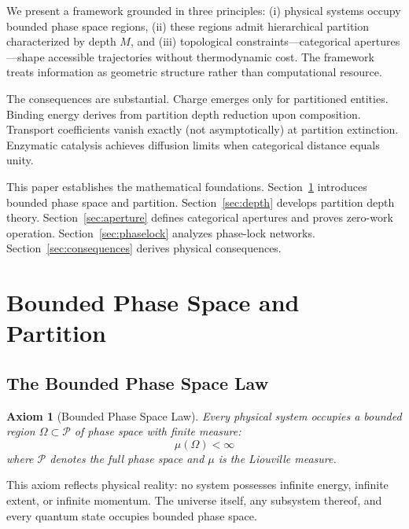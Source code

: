 \documentclass[twocolumn,amsmath,amssymb,aps,prl,superscriptaddress]{revtex4-2}
\newtheorem{axiom}{Axiom}
\newcommand{\Mpart}{M}
\newcommand{\Pspace}{\mathcal{P}}
\begin{document}
We present a framework grounded in three principles: (i) physical systems occupy bounded phase space regions, (ii) these regions admit hierarchical partition characterized by depth $\Mpart$, and (iii) topological constraints---categorical apertures---shape accessible trajectories without thermodynamic cost. The framework treats information as geometric structure rather than computational resource.

The consequences are substantial. Charge emerges only for partitioned entities. Binding energy derives from partition depth reduction upon composition. Transport coefficients vanish exactly (not asymptotically) at partition extinction. Enzymatic catalysis achieves diffusion limits when categorical distance equals unity.

This paper establishes the mathematical foundations. Section~\ref{sec:bounded} introduces bounded phase space and partition. Section~\ref{sec:depth} develops partition depth theory. Section~\ref{sec:aperture} defines categorical apertures and proves zero-work operation. Section~\ref{sec:phaselock} analyzes phase-lock networks. Section~\ref{sec:consequences} derives physical consequences.

\section{Bounded Phase Space and Partition}
\label{sec:bounded}

\subsection{The Bounded Phase Space Law}

\begin{axiom}[Bounded Phase Space Law]
\label{ax:bounded}
Every physical system occupies a bounded region $\Omega \subset \Pspace$ of phase space with finite measure:
\begin{equation}
\mu(\Omega) < \infty
\end{equation}
where $\Pspace$ denotes the full phase space and $\mu$ is the Liouville measure.
\end{axiom}

This axiom reflects physical reality: no system possesses infinite energy, infinite extent, or infinite momentum. The universe itself, any subsystem thereof, and every quantum state occupies bounded phase space.
\end{document}
